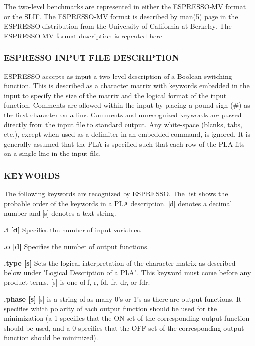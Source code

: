 {\begin{pespace}
The two-level benchmarks are represented in either
the ESPRESSO-MV format or the SLIF.
The ESPRESSO-MV format is
described by man(5) page in the ESPRESSO distribution from
the University of California at Berkeley.
The ESPRESSO-MV format description is repeated here.



\subsubsection{ESPRESSO INPUT FILE DESCRIPTION}
     ESPRESSO accepts as input a two-level description of a
     Boolean switching function.  This is described as a character 
     matrix with keywords embedded in the input to specify
     the size of the matrix and the logical format of the input
     function.  Comments are allowed within the input by placing
     a pound sign (\#) as the first character on a line.  Comments
     and unrecognized keywords are passed directly from the input
     file to standard output.  Any white-space (blanks, tabs,
     etc.), except when used as a delimiter in an embedded command, 
is ignored.  It is generally assumed that the PLA is
     specified such that each row of the PLA fits on a single
     line in the input file.

\subsubsection{KEYWORDS}
     The following keywords are recognized by ESPRESSO.  The list
     shows the probable order of the keywords in a PLA description.  
[d] denotes a decimal number and [s] denotes a text
     string.

    {\bf .i [d]}      Specifies the number of input variables.

   {\bf  .o [d] }     Specifies the number of output functions.

    {\bf .type [s]}   Sets the logical interpretation of the character
                 matrix as described below under "Logical
                 Description of a PLA".  This keyword must come
                 before any product terms.  [s] is one of f, r,
                 fd, fr, dr, or fdr.


    {\bf .phase [s]}  [s] is a string of as many 0's or 1's as there
                 are output functions.  It specifies which polarity 
of each output function should be used for
                 the minimization (a 1 specifies that the ON-set
                 of the corresponding output function should be
                 used, and a 0 specifies that the OFF-set of the
                 corresponding output function should be minimized).


\end{pespace}}
